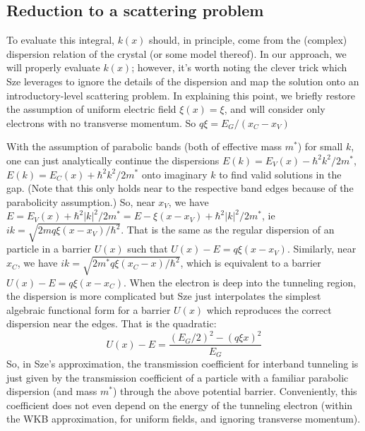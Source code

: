 \subsection{Reduction to a scattering problem}
To evaluate this integral, $k(x)$ should, in principle, come from the (complex) dispersion relation of the crystal (or some model thereof).  In our approach, we will properly evaluate $k(x)$; however, it's worth noting the clever trick which Sze leverages to ignore the details of the dispersion and map the solution onto an introductory-level scattering problem.  In explaining this point, we briefly restore the assumption of uniform electric field $\xi(x)=\xi$, and will consider only electrons with no transverse momentum.  So $q\xi=E_G/(x_C-x_V)$

With the assumption of parabolic bands (both of effective mass $m^*$) for small $k$, one can just analytically continue the dispersions $E(k)=E_V(x)-\hbar^2k^2/2m^*$, $E(k)=E_C(x)+\hbar^2k^2/2m^*$ onto imaginary $k$ to find valid solutions in the gap.  (Note that this only holds near to the respective band edges because of the parabolicity assumption.)  So, near $x_V$, we have $E=E_V(x)+\hbar^2|k|^2/2m^*=E-\xi(x-x_V)+\hbar^2|k|^2/2m^*$, ie $ik=\sqrt{2mq\xi(x-x_V)/\hbar^2}$.  That is the same as the regular dispersion of an particle in a barrier $U(x)$ such that $U(x)-E=q\xi(x-x_V)$.  Similarly, near $x_C$, we have $ik=\sqrt{2m^*q\xi(x_C-x)/\hbar^2}$, which is equivalent to a barrier $U(x)-E=q\xi(x-x_C)$.  When the electron is deep into the tunneling region, the dispersion is more complicated but Sze just interpolates the simplest algebraic functional form for a barrier $U(x)$ which reproduces the correct dispersion near the edges.  That is the quadratic:
$$U(x)-E=\frac{(E_G/2)^2-(q\xi x)^2}{E_G}$$
So, in Sze's approximation, the transmission coefficient for interband tunneling is just given by the transmission coefficient of a particle with a familiar parabolic dispersion (and mass $m^*$) through the above potential barrier.  Conveniently, this coefficient does not even depend on the energy of the tunneling electron (within the WKB approximation, for uniform fields, and ignoring transverse momentum).